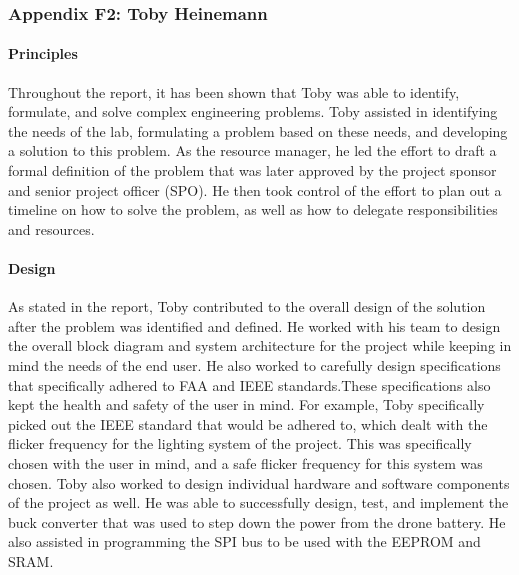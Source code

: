 \documentclass[../../main.tex]{subfiles}
\begin{document}
\subsubsection{Appendix F2: Toby Heinemann}

\paragraph{Principles}
\par Throughout the report, it has been shown that Toby was able to identify, formulate, and solve complex engineering problems. Toby assisted in identifying the needs of the lab, formulating a problem based on these needs, and developing a solution to this problem. As the resource manager, he led the effort to draft a formal definition of the problem that was later approved by the project sponsor and senior project officer (SPO). He then took control of the effort to plan out a timeline on how to solve the problem, as well as how to delegate responsibilities and resources. 

\paragraph{Design}
\par As stated in the report, Toby contributed to the overall design of the solution after the problem was identified and defined. He worked with his team to design the overall block diagram and system architecture for the project while keeping in mind the needs of the end user. He also worked to carefully design specifications that specifically adhered to FAA and IEEE standards.These specifications also kept the health and safety of the user in mind. For example, Toby specifically picked out the IEEE standard that would be adhered to, which dealt with the flicker frequency for the lighting system of the project. This was specifically chosen with the user in mind, and a safe flicker frequency for this system was chosen. Toby also worked to design individual hardware and software components of the project as well. He was able to successfully design, test, and implement the buck converter that was used to step down the power from the drone battery. He also assisted in programming the SPI bus to be used with the EEPROM and SRAM.
\end{document}
